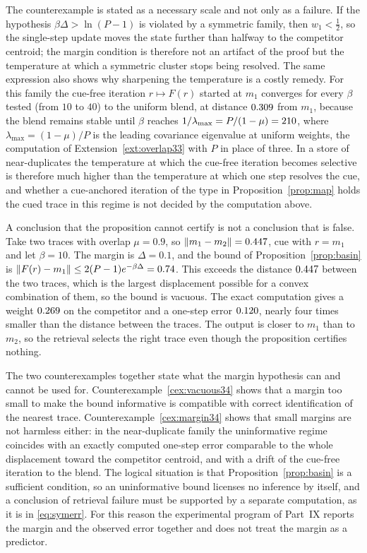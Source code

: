 The counterexample is stated as a necessary scale and not only as a failure. If the hypothesis $\beta\Delta>\ln(P-1)$ is violated by a symmetric family, then $w_1<\tfrac12$, so the single-step update moves the state further than halfway to the competitor centroid; the margin condition is therefore not an artifact of the proof but the temperature at which a symmetric cluster stops being resolved. The same expression also shows why sharpening the temperature is a costly remedy. For this family the cue-free iteration $r\mapsto F(r)$ started at $m_1$ converges for every $\beta$ tested (from $10$ to $40$) to the uniform blend, at distance $0.309$ from $m_1$, because the blend remains stable until $\beta$ reaches $1/\lambda_{\max}=P/(1-\mu)=210$, where $\lambda_{\max}=(1-\mu)/P$ is the leading covariance eigenvalue at uniform weights, the computation of Extension~\ref{ext:overlap33} with $P$ in place of three. In a store of near-duplicates the temperature at which the cue-free iteration becomes selective is therefore much higher than the temperature at which one step resolves the cue, and whether a cue-anchored iteration of the type in Proposition~\ref{prop:map} holds the cued trace in this regime is not decided by the computation above.

\begin{counterex}\label{cex:vacuous34}
A conclusion that the proposition cannot certify is not a conclusion that is false. Take two traces with overlap $\mu=0.9$, so $\lVert m_1-m_2\rVert=0.447$, cue with $r=m_1$ and let $\beta=10$. The margin is $\Delta=0.1$, and the bound of Proposition~\ref{prop:basin} is $\lVert F(r)-m_1\rVert\le2(P-1)e^{-\beta\Delta}=0.74$. This exceeds the distance $0.447$ between the two traces, which is the largest displacement possible for a convex combination of them, so the bound is vacuous. The exact computation gives a weight $0.269$ on the competitor and a one-step error $0.120$, nearly four times smaller than the distance between the traces. The output is closer to $m_1$ than to $m_2$, so the retrieval selects the right trace even though the proposition certifies nothing.
\end{counterex}

The two counterexamples together state what the margin hypothesis can and cannot be used for. Counterexample~\ref{cex:vacuous34} shows that a margin too small to make the bound informative is compatible with correct identification of the nearest trace. Counterexample~\ref{cex:margin34} shows that small margins are not harmless either: in the near-duplicate family the uninformative regime coincides with an exactly computed one-step error comparable to the whole displacement toward the competitor centroid, and with a drift of the cue-free iteration to the blend. The logical situation is that Proposition~\ref{prop:basin} is a sufficient condition, so an uninformative bound licenses no inference by itself, and a conclusion of retrieval failure must be supported by a separate computation, as it is in \eqref{eq:symerr}. For this reason the experimental program of Part~IX reports the margin and the observed error together and does not treat the margin as a predictor.


